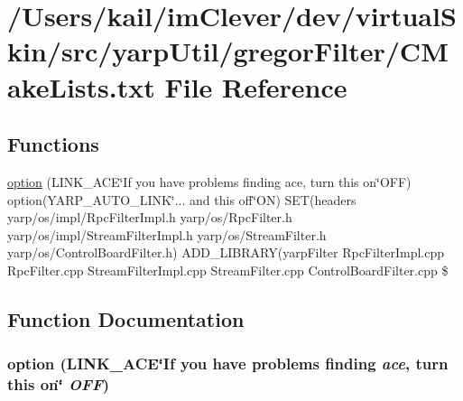 \hypertarget{src_2yarp_util_2gregor_filter_2_c_make_lists_8txt}{
\section{/Users/kail/imClever/dev/virtualSkin/src/yarpUtil/gregorFilter/CMakeLists.txt File Reference}
\label{src_2yarp_util_2gregor_filter_2_c_make_lists_8txt}
}
\subsection*{Functions}
\begin{DoxyCompactItemize}
\item 
\hyperlink{src_2yarp_util_2gregor_filter_2_c_make_lists_8txt_aac57cbe463115ad100022549eba4c121}{option} (LINK\_\-ACE\char`\"{}If you have problems finding ace, turn this on\char`\"{}OFF) option(YARP\_\-AUTO\_\-LINK\char`\"{}... and this off\char`\"{}ON) SET(headers yarp/os/impl/RpcFilterImpl.h yarp/os/RpcFilter.h yarp/os/impl/StreamFilterImpl.h yarp/os/StreamFilter.h yarp/os/ControlBoardFilter.h) ADD\_\-LIBRARY(yarpFilter RpcFilterImpl.cpp RpcFilter.cpp StreamFilterImpl.cpp StreamFilter.cpp ControlBoardFilter.cpp \$
\end{DoxyCompactItemize}


\subsection{Function Documentation}
\hypertarget{src_2yarp_util_2gregor_filter_2_c_make_lists_8txt_aac57cbe463115ad100022549eba4c121}{
\subsubsection[{option}]{\setlength{\rightskip}{0pt plus 5cm}option (LINK\_\-ACE\char`\"{}If you have problems finding  {\em ace}, \/  turn this on\char`\"{}  {\em OFF})}}
\label{src_2yarp_util_2gregor_filter_2_c_make_lists_8txt_aac57cbe463115ad100022549eba4c121}
